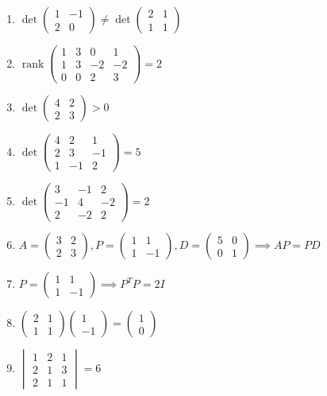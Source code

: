 \documentclass[11pt,a4paper]{article}
\begin{document}
\begin{enumerate}
\item $\displaystyle \det \begin{pmatrix} 1 & -1 \\ 2 & 0 \end{pmatrix} \neq \det \begin{pmatrix} 2 & 1 \\ 1 & 1 \end{pmatrix}$
\item $\displaystyle \operatorname{rank} \begin{pmatrix} 1 & 3 & 0 & 1 \\ 1 & 3 & -2 & -2 \\ 0 & 0 & 2 & 3 \end{pmatrix} = 2$
\item $\displaystyle \det \begin{pmatrix} 4 & 2 \\ 2 & 3 \end{pmatrix} > 0$
\item $\displaystyle \det \begin{pmatrix} 4 & 2 & 1 \\ 2 & 3 & -1 \\ 1 & -1 & 2 \end{pmatrix} = 5$
\item $\displaystyle \det \begin{pmatrix} 3 & -1 & 2 \\ -1 & 4 & -2 \\ 2 & -2 & 2 \end{pmatrix} = 2$
\item $\displaystyle A = \begin{pmatrix} 3 & 2 \\ 2 & 3 \end{pmatrix}, P = \begin{pmatrix} 1 & 1 \\ 1 & -1 \end{pmatrix}, D = \begin{pmatrix} 5 & 0 \\ 0 & 1 \end{pmatrix} \implies A P = P D$
\item $\displaystyle P = \begin{pmatrix} 1 & 1 \\ 1 & -1 \end{pmatrix} \implies P^{T} P = 2I$
\item $\displaystyle \begin{pmatrix} 2 & 1 \\ 1 & 1 \end{pmatrix} \begin{pmatrix} 1 \\ -1 \end{pmatrix} = \begin{pmatrix} 1 \\ 0 \end{pmatrix}$
\item $\displaystyle \begin{vmatrix} 1 & 2 & 1 \\ 2 & 1 & 3 \\ 2 & 1 & 1 \end{vmatrix} = 6$
\end{enumerate}
\end{document}
